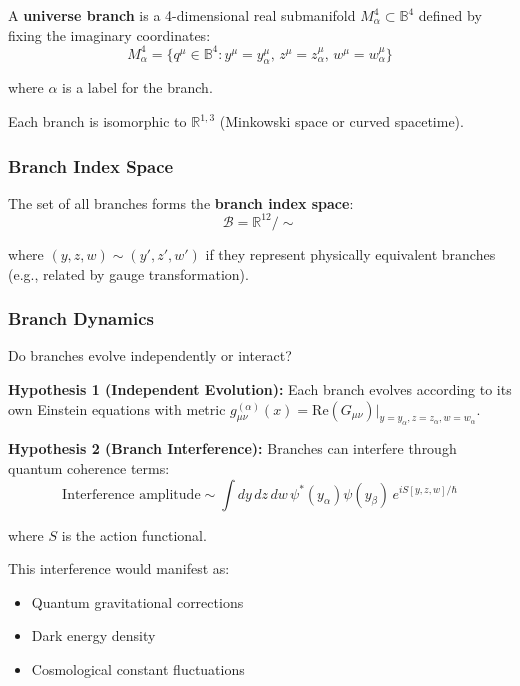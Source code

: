 A \textbf{universe branch} is a 4-dimensional real submanifold $M^4_{\alpha} \subset \mathbb{B}^4$ defined by fixing the imaginary coordinates:
\begin{equation}
M^4_{\alpha} = \{q^{\mu} \in \mathbb{B}^4 : y^{\mu} = y^{\mu}_{\alpha}, \, z^{\mu} = z^{\mu}_{\alpha}, \, w^{\mu} = w^{\mu}_{\alpha}\}
\end{equation}

where $\alpha$ is a label for the branch.

Each branch is isomorphic to $\mathbb{R}^{1,3}$ (Minkowski space or curved spacetime).

\subsubsection{Branch Index Space}

The set of all branches forms the \textbf{branch index space}:
\begin{equation}
\mathcal{B} = \mathbb{R}^{12} / \sim
\end{equation}

where $(y, z, w) \sim (y', z', w')$ if they represent physically equivalent branches (e.g., related by gauge transformation).

\subsubsection{Branch Dynamics}

Do branches evolve independently or interact?

\textbf{Hypothesis 1 (Independent Evolution):} Each branch evolves according to its own Einstein equations with metric $g_{\mu\nu}^{(\alpha)}(x) = \text{Re}(G_{\mu\nu})|_{y=y_{\alpha}, z=z_{\alpha}, w=w_{\alpha}}$.

\textbf{Hypothesis 2 (Branch Interference):} Branches can interfere through quantum coherence terms:
\begin{equation}
\text{Interference amplitude} \sim \int dy\,dz\,dw \, \psi^*(y_{\alpha}) \psi(y_{\beta}) \, e^{iS[y,z,w]/\hbar}
\end{equation}

where $S$ is the action functional.

This interference would manifest as:
\begin{itemize}
\item Quantum gravitational corrections
\item Dark energy density
\item Cosmological constant fluctuations
\end{itemize}

